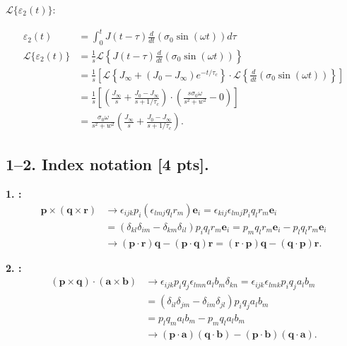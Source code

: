 $\mathcal{L}\{\varepsilon_2(t)\}$:

\begin{align*}
    \varepsilon_2 (t) &= \int_0^t J(t-\tau) \frac{d}{d t}(\sigma_0 \sin(\omega t)) d\tau \\
    \mathcal{L}\{\varepsilon_2(t)\} &= \frac{1}{s} \mathcal{L} \left\{ J(t-\tau) \frac{d}{d t}(\sigma_0 \sin(\omega t)) \right\} \\
    &= \frac{1}{s} \left[ \mathcal{L} \left\{ J_\infty + (J_0 - J_\infty) e^{-t/\tau_c}\right\}
    \cdot \mathcal{L} \left\{ \frac{d}{dt}(\sigma_0 \sin(\omega t)) \right\}\right] \\
    &= \frac{1}{s} \left[ \left( \frac{J_\infty}{s} + \frac{J_0-J_\infty}{s+1/\tau_c} \right)
    \cdot \left( \frac{s\sigma_0 \omega}{s^2 + w^2} - 0 \right) \right]\\
    &= \boxed{\frac{\sigma_0 \omega}{s^2 + w^2} \left( \frac{J_\infty}{s} + \frac{J_0-J_\infty}{s+1/\tau_c} \right).}
\end{align*}

\newpage
\subsection*{1--2. \textbf{Index notation} [4 pts].}
\textbf{1. :}
\begin{align*}
    \bm{p} \times (\bm{q} \times \bm{r}) &\rightarrow \epsilon_{ijk} p_i (\epsilon_{lmj} q_l r_m)\bm{e}_i = \epsilon_{kij} \epsilon_{lmj} p_i q_l r_m \bm{e}_i\\
    &= (\delta_{kl} \delta_{im} - \delta_{km} \delta_{il}) p_i q_l r_m \bm{e}_i = p_m q_l r_m \bm{e}_i - p_l q_l r_m \bm{e}_i\\
    &\rightarrow \boxed{(\bm{p} \cdot \bm{r})\bm{q} - (\bm{p} \cdot \bm{q})\bm{r} = (\bm{r} \cdot \bm{p}) \bm{q} - (\bm{q} \cdot \bm{p}) \bm{r}.}
\end{align*}

\textbf{2. :}
\begin{align*}
    (\bm{p} \times \bm{q}) \cdot (\bm{a} \times \bm{b}) &\rightarrow \epsilon_{ijk} p_i q_j \epsilon_{lmn} a_l b_m \delta_{kn} = \epsilon_{ijk} \epsilon_{lmk} p_i q_j a_l b_m\\
    &= (\delta_{il} \delta_{jm} -\delta_{im}\delta_{jl}) p_i q_j a_l b_m \\
    &= p_l q_m a_l b_m - p_m q_l a_l b_m \\
    &\rightarrow \boxed{(\bm{p} \cdot \bm{a}) (\bm{q} \cdot \bm{b}) - (\bm{p} \cdot \bm{b}) (\bm{q} \cdot \bm{a}).}
\end{align*}

